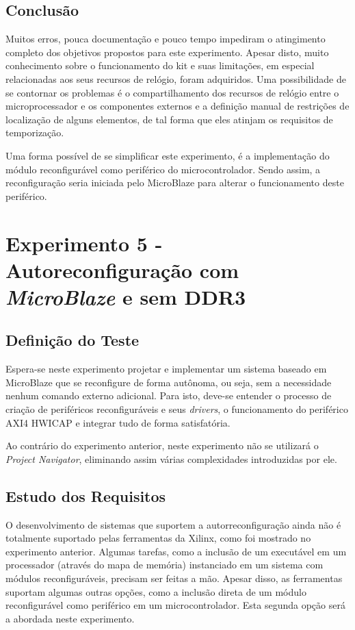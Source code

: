 \documentclass[11pt,a4paper,oneside]{book}
\begin{document}
\section{Conclusão}
Muitos erros, pouca documentação e pouco tempo impediram o atingimento completo dos objetivos propostos para este experimento.
Apesar disto, muito conhecimento sobre o funcionamento do kit e suas limitações, em especial relacionadas aos seus recursos de relógio, foram adquiridos.
Uma possibilidade de se contornar os problemas é o compartilhamento dos recursos de relógio entre o microprocessador e os componentes externos e a definição manual de restrições de localização de alguns elementos, de tal forma que eles atinjam os requisitos de temporização.

Uma forma possível de se simplificar este experimento, é a implementação do módulo reconfigurável como periférico do microcontrolador.
Sendo assim, a reconfiguração seria iniciada pelo MicroBlaze para alterar o funcionamento deste periférico.


\chapter{Experimento 5 - Autoreconfiguração com \textit{MicroBlaze} e sem DDR3}

\section{Definição do Teste}
Espera-se neste experimento projetar e implementar um sistema baseado em MicroBlaze que se reconfigure de forma autônoma, ou seja, sem a necessidade nenhum comando externo adicional.
Para isto, deve-se entender o processo de criação de periféricos reconfiguráveis e seus \textit{drivers}, o funcionamento do periférico AXI4 HWICAP e integrar tudo de forma satisfatória.

Ao contrário do experimento anterior, neste experimento não se utilizará o \textit{Project Navigator}, eliminando assim várias complexidades introduzidas por ele.

\section{Estudo dos Requisitos}
O desenvolvimento de sistemas que suportem a autorreconfiguração ainda não é totalmente suportado pelas ferramentas da Xilinx, como foi mostrado no experimento anterior.
Algumas tarefas, como a inclusão de um executável em um processador (através do mapa de memória) instanciado em um sistema com módulos reconfiguráveis, precisam ser feitas a mão.
Apesar disso, as ferramentas suportam algumas outras opções, como a inclusão direta de um módulo reconfigurável como periférico em um microcontrolador.
Esta segunda opção será a abordada neste experimento.
\end{document}
